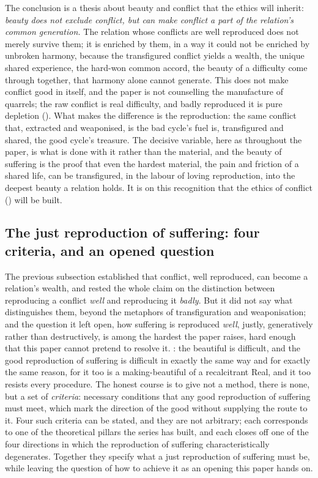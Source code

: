 The conclusion is a thesis about beauty and conflict that the ethics will inherit: \emph{beauty does not exclude conflict, but can make conflict a part of the relation's common generation.} The relation whose conflicts are well reproduced does not merely survive them; it is enriched by them, in a way it could not be enriched by unbroken harmony, because the transfigured conflict yields a wealth, the unique shared experience, the hard-won common accord, the beauty of a difficulty come through together, that harmony alone cannot generate. This does not make conflict good in itself, and the paper is not counselling the manufacture of quarrels; the raw conflict is real difficulty, and badly reproduced it is pure depletion (). What makes the difference is the reproduction: the same conflict that, extracted and weaponised, is the bad cycle's fuel is, transfigured and shared, the good cycle's treasure. The decisive variable, here as throughout the paper, is what is done with it rather than the material, and the beauty of suffering is the proof that even the hardest material, the pain and friction of a shared life, can be transfigured, in the labour of loving reproduction, into the deepest beauty a relation holds. It is on this recognition that the ethics of conflict () will be built.

\subsection{The just reproduction of suffering: four criteria, and an opened question}
\label{p21:sub:just-suffering}

The previous subsection established that conflict, well reproduced, can become a relation's wealth, and rested the whole claim on the distinction between reproducing a conflict \emph{well} and reproducing it \emph{badly}. But it did not say what distinguishes them, beyond the metaphors of transfiguration and weaponisation; and the question it left open, how suffering is reproduced \emph{well}, justly, generatively rather than destructively, is among the hardest the paper raises, hard enough that this paper cannot pretend to resolve it. : the beautiful is difficult, and the good reproduction of suffering is difficult in exactly the same way and for exactly the same reason, for it too is a making-beautiful of a recalcitrant Real, and it too resists every procedure. The honest course is to give not a method, there is none, but a set of \emph{criteria}: necessary conditions that any good reproduction of suffering must meet, which mark the direction of the good without supplying the route to it. Four such criteria can be stated, and they are not arbitrary; each corresponds to one of the theoretical pillars the series has built, and each closes off one of the four directions in which the reproduction of suffering characteristically degenerates. Together they specify what a just reproduction of suffering must be, while leaving the question of how to achieve it as an opening this paper hands on.

